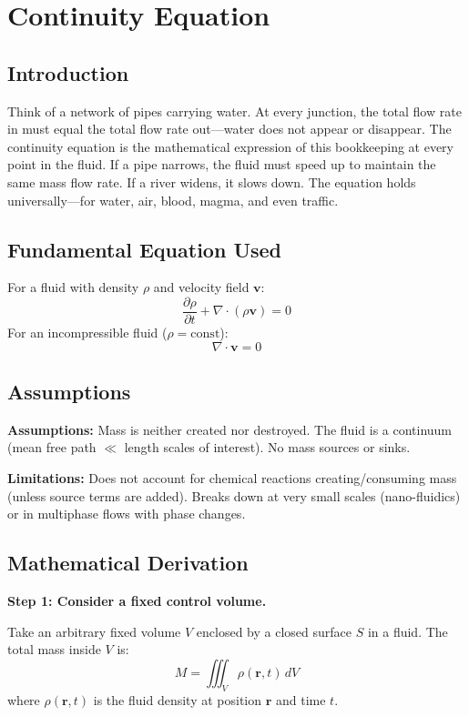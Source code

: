 \documentclass[11pt,openright]{book}
\begin{document}

\chapter{Continuity Equation}

\section*{Introduction}

Think of a network of pipes carrying water. At every junction, the total flow rate in must equal the total flow rate out---water does not appear or disappear. The continuity equation is the mathematical expression of this bookkeeping at every point in the fluid. If a pipe narrows, the fluid must speed up to maintain the same mass flow rate. If a river widens, it slows down. The equation holds universally---for water, air, blood, magma, and even traffic.
\section*{Fundamental Equation Used}

For a fluid with density $\rho$ and velocity field $\mathbf{v}$:
\[
\frac{\partial \rho}{\partial t} + \nabla \cdot (\rho \mathbf{v}) = 0
\]
For an incompressible fluid ($\rho = \text{const}$):
\[
\nabla \cdot \mathbf{v} = 0
\]
\section*{Assumptions}

\textbf{Assumptions:} Mass is neither created nor destroyed. The fluid is a continuum (mean free path $\ll$ length scales of interest). No mass sources or sinks.


\textbf{Limitations:} Does not account for chemical reactions creating/consuming mass (unless source terms are added). Breaks down at very small scales (nano-fluidics) or in multiphase flows with phase changes.


\section*{Mathematical Derivation}

\textbf{Step 1: Consider a fixed control volume.}

Take an arbitrary fixed volume $V$ enclosed by a closed surface $S$ in a fluid. The total mass inside $V$ is:
\begin{equation}
M = \iiint_V \rho(\mathbf{r}, t)\, dV
\end{equation}
where $\rho(\mathbf{r}, t)$ is the fluid density at position $\mathbf{r}$ and time $t$.
\end{document}
